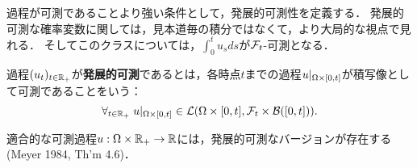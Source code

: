 \documentclass[uplatex,dvipdfmx]{jsreport}
\begin{document}
\begin{tcolorbox}[colframe=ForestGreen, colback=ForestGreen!10!white,breakable,colbacktitle=ForestGreen!40!white,coltitle=black,fonttitle=\bfseries\sffamily,
title=発展的可測性とは$\P/\B(\R)$-可測性である]
    過程が可測であることより強い条件として，発展的可測性を定義する．
    発展的可測な確率変数に関しては，見本道毎の積分ではなくて，より大局的な視点で見れる．
    そしてこのクラスについては，$\int^t_0u_sds$が$\mathcal{F}_t$-可測となる．
\end{tcolorbox}

\begin{definition}
    過程$(u_t)_{t\in\mathbb{R}_+}$が\textbf{発展的可測}であるとは，各時点$t$までの過程$u|_{\Omega\times[0,t]}$が積写像として可測であることをいう：
    \[\forall_{t\in\mathbb{R}_+}\;u|_{\Omega\times[0,t]}\in\mathcal{L}(\Omega\times[0,t],\mathcal{F}_t\times\mathcal{B}([0,t])).\]
\end{definition}

\begin{lemma}[発展的可測性の十分条件]
    適合的な可測過程$u:\Omega\times\mathbb{R}_+\to\mathbb{R}$には，発展的可測なバージョンが存在する(Meyer 1984, Th'm 4.6)．
\end{lemma}
\end{document}
